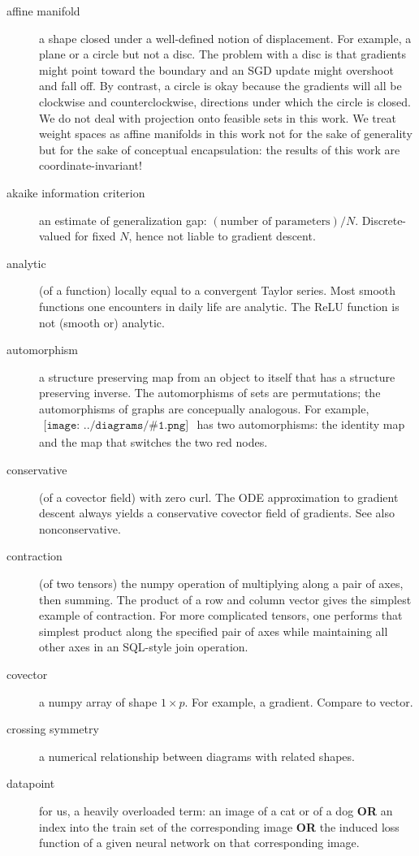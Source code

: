 \documentclass{article}
\theoremstyle{plain}
\theoremstyle{definition}
\newcommand{\sdia}[1]{\begin{gathered}\texttt{[image: ../diagrams/\#1.png]}\end{gathered}}
\begin{document}
    \begin{description}
        \item[affine manifold] a shape closed under a well-defined notion of displacement.  For example, a plane or a circle but not a disc.  The problem with a disc is that gradients might point toward the boundary and an SGD update might overshoot and fall off.  By contrast, a circle is okay because the gradients will all be clockwise and counterclockwise, directions under which the circle is closed.  We do not deal with projection onto feasible sets in this work.  We treat weight spaces as affine manifolds in this work not for the sake of generality but for the sake of conceptual encapsulation: the results of this work are coordinate-invariant! 
        \item[akaike information criterion] an estimate of generalization gap: $(\text{number of parameters})/N$.  Discrete-valued for fixed $N$, hence not liable to gradient descent. 
        \item[analytic] (of a function) locally equal to a convergent Taylor series.  Most smooth functions one encounters in daily life are analytic.  The ReLU function is not (smooth or) analytic. 
        \item[automorphism] a structure preserving map from an object to itself that has a structure preserving inverse.  The automorphisms of sets are permutations; the automorphisms of graphs are concepually analogous.  For example, $\sdia{(01-2)(02-12)}$ has two automorphisms: the identity map and the map that switches the two {\color{moor}red} nodes.   
        \item[conservative] (of a covector field) with zero curl.  The ODE approximation to gradient descent always yields a conservative covector field of gradients.  See also nonconservative. 
        \item[contraction] (of two tensors) the numpy operation of multiplying along a pair of axes, then summing.  The product of a row and column vector gives the simplest example of contraction.  For more complicated tensors, one performs that simplest product along the specified pair of axes while maintaining all other axes in an SQL-style join operation.  
        \item[covector] a numpy array of shape $1\times p$.  For example, a gradient.  Compare to vector.
        \item[crossing symmetry] a numerical relationship between diagrams with related shapes. 
        \item[datapoint] for us, a heavily overloaded term: an image of a cat or of a dog {\bf OR} an index into the train set of the corresponding image {\bf OR} the induced loss function of a given neural network on that corresponding image.  

\end{description}
\end{document}
